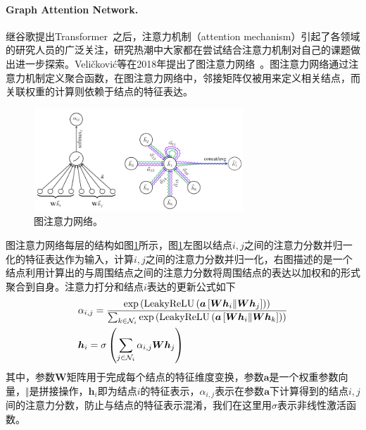 \documentclass[final]{cvpr}
\newcommand{\mypara}[1]{\paragraph{#1.}}
\begin{document}
\mypara{Graph Attention Network} 
继谷歌提出Transformer~\cite{vaswani2017attention}之后，注意力机制（attention mechanism）引起了各领域的研究人员的广泛关注，研究热潮中大家都在尝试结合注意力机制对自己的课题做出进一步探索。Veličković等在2018年提出了图注意力网络~\cite{velivckovic2018graph}。图注意力网络通过注意力机制定义聚合函数，在图注意力网络中，邻接矩阵仅被用来定义相关结点，而关联权重的计算则依赖于结点的特征表达。
\begin{figure}[htb!]
    \centering
    \includegraphics[width=0.70\textwidth]{GAT.png}
    \caption{图注意力网络。}
    \label{fig:GAT}
\end{figure}

图注意力网络每层的结构如图\ref{fig:GAT}所示，图\ref{fig:GAT}左图以结点$i,j$之间的注意力分数并归一化的特征表达作为输入，计算$i,j$之间的注意力分数并归一化，右图描述的是一个结点利用计算出的与周围结点之间的注意力分数将周围结点的表达以加权和的形式聚合到自身。注意力打分和结点$i$表达的更新公式如下
\begin{align}
    &\alpha_{i,j}
    = \frac{
    \exp \left(
    \mathrm{LeakyReLU} \left(
    \boldsymbol{a} \left[ \boldsymbol{Wh}_i
    \Vert \boldsymbol{Wh}_j \right]
    \right) \right)}{
    \sum_{k \in \mathcal{N}_i}
    \exp \left(
    \mathrm{LeakyReLU} \left(
    \boldsymbol{a} \left[ \boldsymbol{Wh} _i
    \Vert \boldsymbol{Wh}_k \right]
    \right) \right)
    } \notag \\
    &\boldsymbol{h}_i =
    \sigma \left(
    \sum_{j \in \mathcal{N}_i}
    \alpha_{i,j} \boldsymbol{Wh}_j
    \right) \label{gat-formula} 
\end{align}
其中，参数$\boldsymbol{W}$矩阵用于完成每个结点的特征维度变换，参数$\boldsymbol{a}$是一个权重参数向量，$\Vert$是拼接操作，$\boldsymbol{h} _i$即为结点$i$的特征表示，$\alpha_{i,j}$表示在参数$\boldsymbol{a}$下计算得到的结点$i,j$间的注意力分数，防止与结点的特征表示混淆，我们在这里用$\sigma$表示非线性激活函数。
\end{document}

